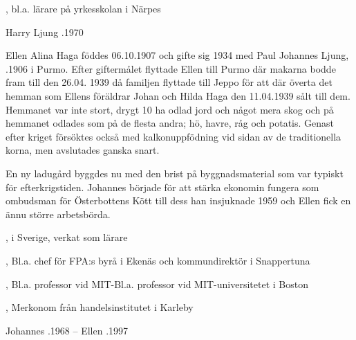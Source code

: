 \begin{jhchildren}
  \item {}
  \item {}, bl.a. lärare på yrkesskolan i Närpes
  \item {}
\end{jhchildren}

Harry Ljung .1970



Ellen Alina Haga föddes 06.10.1907 och gifte sig  1934 med Paul Johannes Ljung, .1906 i Purmo. Efter giftermålet flyttade Ellen till Purmo där makarna bodde fram till den 26.04. 1939 då familjen flyttade till Jeppo för att där överta det hemman som Ellens föräldrar Johan och Hilda Haga den 11.04.1939 sålt till dem. Hemmanet var inte stort, drygt 10 ha odlad jord och något mera skog och på hemmanet odlades som på de flesta andra; hö, havre, råg och potatis. Genast efter kriget försöktes också med kalkonuppfödning vid sidan av de traditionella korna, men avslutades ganska snart.


En ny ladugård byggdes nu med den brist på byggnadsmaterial som var typiskt för efterkrigstiden. Johannes började för att stärka ekonomin fungera som ombudsman för Österbottens Kött till dess han insjuknade 1959 och Ellen fick en ännu större arbetsbörda.

\begin{jhchildren}
  \item {}
  \item {}, i Sverige, verkat som lärare
  \item {}, Bl.a. chef för FPA:s byrå i Ekenäs och kommundirektör i Snappertuna
  \item {}, Bl.a. professor vid MIT-Bl.a. professor vid MIT-universitetet i Boston
  \item {}, Merkonom från handelsinstitutet i Karleby
\end{jhchildren}

Johannes .1968   --    Ellen .1997



